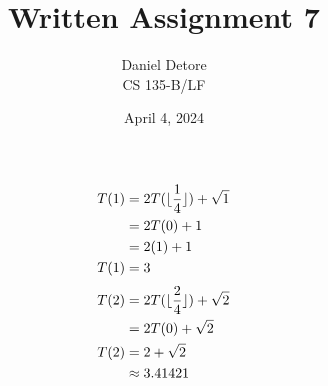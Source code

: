 \documentclass{article}
\title{Written Assignment 7}
\author{Daniel Detore\\CS 135-B/LF}
\date{April 4, 2024}
\DeclarePairedDelimiter{\floor}{\lfloor}{\rfloor}
\begin{document}
\maketitle
\raggedright

\section{}
\subsection{}
\begin{align*}
    T(1) &= 2T(\floor{\frac{1}{4}}) + \sqrt{1} \\
         &= 2T(0) + 1 \\
         &= 2(1) + 1 \\
    T(1) &= 3
\end{align*}
\begin{align*}
    T(2) &= 2T(\floor{\frac{2}{4}}) + \sqrt{2} \\
         &= 2T(0) + \sqrt{2} \\
    T(2) &= 2 + \sqrt{2}\\
         &\approx 3.41421
\end{align*}
\end{document}
